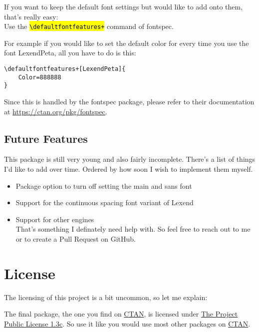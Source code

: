 \documentclass[oneside,a4paper]{l3doc}
\DeclareRobustCommand{\code}[1]{{\sethlcolor{lightgray}\texttt{\hl{#1}}}}
\providecommand{\tightlist}{%
  \setlength{\itemsep}{0pt}\setlength{\parskip}{0pt}}
\begin{document}
If you want to keep the default font settings but would like to add onto them, that's really easy:\\
Use the \code{\textbackslash{}defaultfontfeatures+} command of \textsf{fontspec}.

\bigskip

For example if you would like to set the default color for every time you use the font
\textsf{LexendPeta}, all you have to do is this:

\begin{lstlisting}[language={[LaTeX]TeX}]
\defaultfontfeatures+[LexendPeta]{
	Color=888888
}
\end{lstlisting}

Since this is handled by the \textsf{fontspec} package, please refer to their documentation at
\url{https://ctan.org/pkg/fontspec}.

\subsection{Future Features}

This package is still very young and also fairly incomplete. There's a list of things I'd like to
add over time. Ordered by how soon I wish to implement them myself.

\begin{itemize}
\item Package option to turn off setting the main and sans font\tightlist
\item Support for the continuous spacing font variant of Lexend\tightlist
\item Support for other  engines\\
	That's something I definately need help with. So feel free to reach out to me or to create a
	Pull Request on GitHub.\tightlist
\end{itemize}

\section{License}

The licensing of this project is a bit uncommon, so let me explain:

The final package, the one you find on \href{https://ctan.org/}{CTAN}, is licensed under
\href{https://ctan.org/license/lppl1.3c}{The  Project Public License 1.3c}. So use it
like you would use most other packages on \href{https://ctan.org/}{CTAN}.
\end{document}
